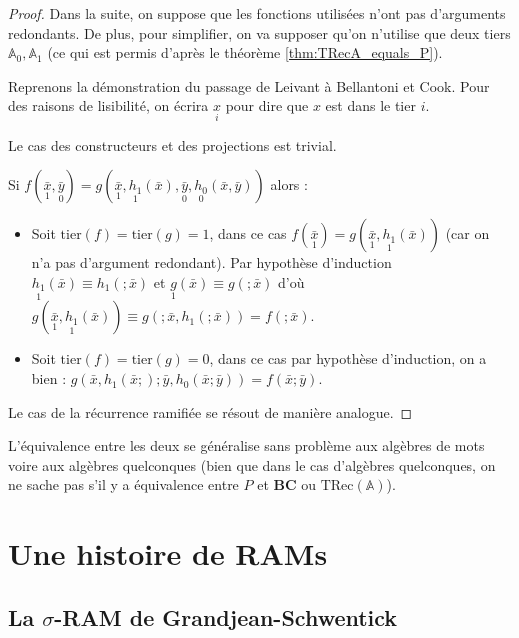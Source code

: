 \documentclass{report}
\newcommand{\bbA}{\mathbb{A}}
\newcommand{\TRec}[1]{\text{TRec}\left(\mathbb{#1}\right)}
\begin{document}
\begin{proof}
				Dans la suite, on suppose que les fonctions utilisées n'ont pas d'arguments redondants. De plus, pour simplifier, on va supposer qu'on n'utilise que deux tiers $\bbA_0, \bbA_1$ (ce qui est permis d'après le théorème \ref{thm:TRecA_equals_P}).
				
				Reprenons la démonstration du passage de Leivant à Bellantoni et Cook. Pour des raisons de lisibilité, on écrira $\underset{i}{x}$ pour dire que $x$ est dans le tier $i$.
				
				Le cas des constructeurs et des projections est trivial.
				
				Si $f(\underset{1}{\bar{x}}, \underset{0}{\bar{y}}) = g( \underset{1}{\bar{x}}, \underset{1}{h_1}(\bar{x}), \underset{0}{\bar{y}}, \underset{0}{h_0}(\bar{x}, \bar{y}))$ alors :
				
				\begin{itemize}[itemsep=-1mm]
					\item 	Soit $\text{tier}(f) = \text{tier}(g) = 1$, dans ce cas $f(\underset{1}{\bar{x}}) = g( \underset{1}{\bar{x}}, \underset{1}{h_1}(\bar{x}))$ (car on n'a pas d'argument redondant). Par hypothèse d'induction $\underset{1}{h_1}(\bar{x}) \equiv h_1(;\bar{x})$ et $\underset{1}{g}(\bar{x}) \equiv g(;\bar{x})$ d'où $g(\underset{1}{\bar{x}}, \underset{1}{h_1}(\bar{x})) \equiv g(; \bar{x}, h_1(;\bar{x})) = f(; \bar{x})$.
					
					\item 	Soit $\text{tier}(f) = \text{tier}(g) = 0$, dans ce cas par hypothèse d'induction, on a bien : $g( \bar{x}, h_1(\bar{x};) ; \bar{y}, h_0(\bar{x}; \bar{y})) = f(\bar{x} ; \bar{y})$.
				\end{itemize}
				
				Le cas de la récurrence ramifiée se résout de manière analogue.
			\end{proof}
			
	
			L'équivalence entre les deux se généralise sans problème aux algèbres de mots voire aux algèbres quelconques (bien que dans le cas d'algèbres quelconques, on ne sache pas s'il y a équivalence entre $P$ et $\textbf{BC}$ ou $\TRec{A}$).
			
		
	\espace
	
	\espace
			
			
	\section{Une histoire de RAMs}
	\label{sec:RAM_story}

	
		\subsection{La $\sigma$-RAM de Grandjean-Schwentick}
		\label{subsec:sigma_RAM}
		
\end{document}
